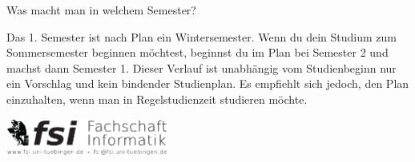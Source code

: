 \begin{block}{Was macht man in welchem Semester?}
\begin{figure}[h!]
{\begin{minipage}{\textwidth}
        \end{minipage}}
\end{figure}
 
    Das 1. Semester ist nach Plan ein Wintersemester. Wenn du dein Studium zum Sommersemester beginnen möchtest, beginnst du im Plan bei Semester 2 und machst dann Semester 1.
    Dieser Verlauf ist unabhängig vom Studienbeginn nur ein Vorschlag und kein bindender Studienplan. Es empfiehlt sich jedoch, den Plan einzuhalten, wenn man in Regelstudienzeit studieren möchte.
\end{block}

\vfill
\begin{flushright}
    \includegraphics[width=0.4\textwidth]{images/fsilogo.pdf}
\end{flushright}